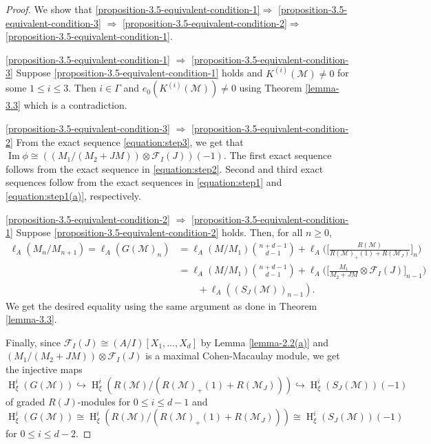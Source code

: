 \documentclass[10pt,a4paper]{amsart}
\def\M{{\mathcal M}}
\DeclareMathOperator{\h}{H}
\def\F{{\mathcal F}}
\DeclareMathOperator{\im}{Im}
\begin{document}
\begin{proof} We show that \ref{proposition-3.5-equivalent-condition-1}$\Rightarrow$ \ref{proposition-3.5-equivalent-condition-3} $\Rightarrow$ \ref{proposition-3.5-equivalent-condition-2}$\Rightarrow$ \ref{proposition-3.5-equivalent-condition-1}.
	\item \ref{proposition-3.5-equivalent-condition-1}  $\Rightarrow$ \ref{proposition-3.5-equivalent-condition-3} 
	Suppose \ref{proposition-3.5-equivalent-condition-1} holds and $K^{(i)}(\M)\neq 0$ for some $1\leq i\leq 3$. Then $i\in\Gamma$ and $e_0(K^{(i)}(\M))\neq 0$ using Theorem \ref{lemma-3.3} which is  a contradiction. 
	
	\item \ref{proposition-3.5-equivalent-condition-3}  $\Rightarrow$ \ref{proposition-3.5-equivalent-condition-2}
	From the exact sequence  \eqref{equation:step3}, we get that $\im \phi\cong ((M_1/(M_2+JM))\otimes\F_I(J))(-1)$. The first exact sequence follows from the exact sequence in \eqref{equation:step2}. Second and third exact sequences follow from the exact sequences in \eqref{equation:step1} and \eqref{equation:step1(a)}, respectively. 
	\item \ref{proposition-3.5-equivalent-condition-2}  $\Rightarrow$ \ref{proposition-3.5-equivalent-condition-1} Suppose \ref{proposition-3.5-equivalent-condition-2}
	holds. Then, for all $n\geq 0$,
	\begin{align*}
		\ell_A(M_n/M_{n+1})=\ell_A(G(\mathcal{M})_n)&=\ell_A(M/M_1)\binom{n+d-1}{d-1}+\ell_A\Big(\Big[\frac{R(\M)}{R(\M)_{+}(1)+R(\M_J)}\Big]_n\Big)\\
		&=\ell_A(M/M_1)\binom{n+d-1}{d-1}+\ell_A\Big(\Big[\frac{M_1}{M_2+JM}\otimes\F_I(J)\Big]_{n-1}\Big)\\
        &\qquad+\ell_A((S_J(\M))_{n-1}).
	\end{align*}
	We get the desired equality using the same argument as done in Theorem \ref{lemma-3.3}.
	
	Finally, since $\F_I(J) \cong (A/I)[X_1,\ldots,X_d]$ by Lemma \ref{lemma-2.2(a)} and  $(M_1/(M_2+JM))\otimes\F_I(J)$ is a maximal 
	Cohen-Macaulay module, we get the injective maps 
	$$\h_\xi^i(G(\M))\hookrightarrow \h_\xi^i(R(\M)/(R(\M)_+(1)+R(\M_J)))\hookrightarrow \h_\xi^i(S_J(\M))(-1)$$
	of graded $R(J)$-modules for $0\leq i\leq d-1$ 
	and $\h_\xi^i(G(\M))\cong \h_{\xi}^i(R(\M)/(R(\M)_+(1)+R(\M_J)))\cong \h_{\xi}^i(S_J(\M))(-1)$ for $0\leq i\leq d-2$.
\end{proof}
\end{document}
